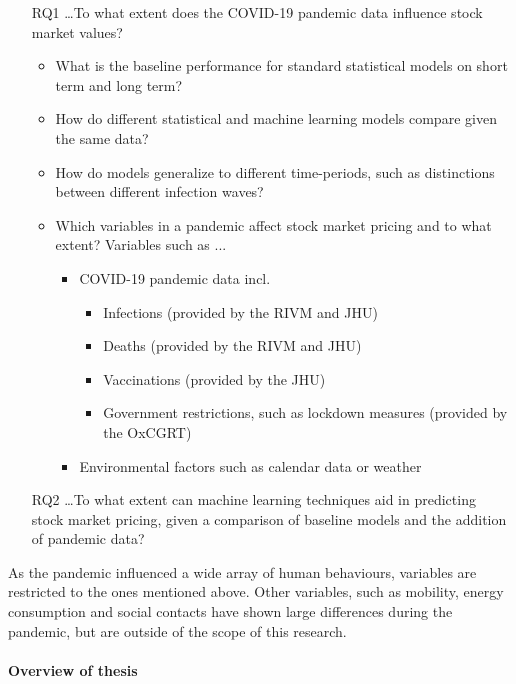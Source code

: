 \begin{itemize}
    \item[RQ1] \ldots To what extent does the COVID-19 pandemic data influence stock market values?
        \begin{itemize}
            \item What is the baseline performance for standard statistical models on short term and long term?
            \item How do different statistical and machine learning models compare given the same data?
            \item How do models generalize to different time-periods, such as distinctions between different infection waves?
            \item Which variables in a pandemic affect stock market pricing and to what extent? Variables such as ...
            \begin{itemize}
                \item COVID-19 pandemic data incl. 
                \begin{itemize}
                    \item Infections (provided by the RIVM and JHU)
                    \item Deaths (provided by the RIVM and JHU)
                    \item Vaccinations (provided by the JHU)
                    \item Government restrictions, such as lockdown measures (provided by the OxCGRT)
                \end{itemize}
                \item Environmental factors such as calendar data or weather
            \end{itemize}
        \end{itemize}
    \item[RQ2] \ldots To what extent can machine learning techniques aid in predicting stock market pricing, given a comparison of baseline models and the addition of pandemic data?
\end{itemize}

As the pandemic influenced a wide array of human behaviours, variables are restricted to the ones mentioned above. Other variables, such as mobility, energy consumption and social contacts have shown large differences during the pandemic, but are outside of the scope of this research.

\paragraph{Overview of thesis}

